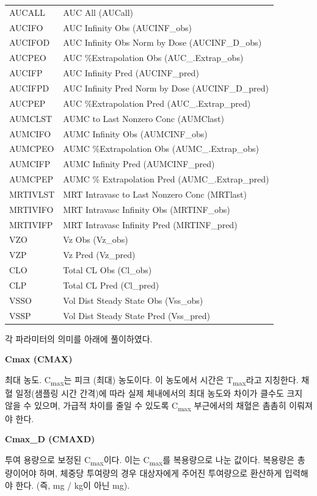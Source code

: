 \documentclass[
  11pt,
  krantz2, a4paper, twoside]{krantz}
\theoremstyle{definition}
\theoremstyle{definition}
\theoremstyle{definition}
\theoremstyle{definition}
\theoremstyle{remark}
\begin{document}
\begin{longtable}[t]{ll}
AUCALL & AUC All (AUCall)\\
AUCIFO & AUC Infinity Obs (AUCINF\_obs)\\
AUCIFOD & AUC Infinity Obs Norm by Dose (AUCINF\_D\_obs)\\
\addlinespace
AUCPEO & AUC \%Extrapolation Obs (AUC\_.Extrap\_obs)\\
AUCIFP & AUC Infinity Pred (AUCINF\_pred)\\
AUCIFPD & AUC Infinity Pred Norm by Dose (AUCINF\_D\_pred)\\
AUCPEP & AUC \%Extrapolation Pred (AUC\_.Extrap\_pred)\\
AUMCLST & AUMC to Last Nonzero Conc (AUMClast)\\
\addlinespace
AUMCIFO & AUMC Infinity Obs (AUMCINF\_obs)\\
AUMCPEO & AUMC \%Extrapolation Obs (AUMC\_.Extrap\_obs)\\
AUMCIFP & AUMC Infinity Pred (AUMCINF\_pred)\\
AUMCPEP & AUMC \% Extrapolation Pred (AUMC\_.Extrap\_pred)\\
MRTIVLST & MRT Intravasc to Last Nonzero Conc (MRTlast)\\
\addlinespace
MRTIVIFO & MRT Intravasc Infinity Obs (MRTINF\_obs)\\
MRTIVIFP & MRT Intravasc Infinity Pred (MRTINF\_pred)\\
VZO & Vz Obs (Vz\_obs)\\
VZP & Vz Pred (Vz\_pred)\\
CLO & Total CL Obs (Cl\_obs)\\
\addlinespace
CLP & Total CL Pred (Cl\_pred)\\
VSSO & Vol Dist Steady State Obs (Vss\_obs)\\
VSSP & Vol Dist Steady State Pred (Vss\_pred)\\
\bottomrule
\end{longtable}

각 파라미터의 의미를 아래에 풀이하였다.

\textbf{Cmax (CMAX)}

최대 농도. C\textsubscript{max}는 피크 (최대) 농도이다. 이 농도에서 시간은 T\textsubscript{max}라고 지칭한다. 채혈 일정(샘플링 시간 간격)에 따라 실제 체내에서의 최대 농도와 차이가 클수도 크지 않을 수 있으며, 가급적 차이를 줄일 수 있도록 C\textsubscript{max} 부근에서의 채혈은 촘촘히 이뤄져야 한다.

\textbf{Cmax\_D (CMAXD)}

투여 용량으로 보정된 C\textsubscript{max}이다. 이는 C\textsubscript{max}를 복용량으로 나눈 값이다. 복용량은 총량이어야 하며, 체중당 투여량의 경우 대상자에게 주어진 투여량으로 환산하게 입력해야 한다. (즉, mg / kg이 아닌 mg).
\end{document}
